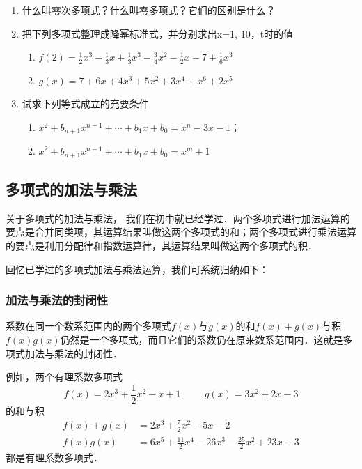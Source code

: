 \begin{ex}
\begin{enumerate}
    \item 
    什么叫零次多项式？什么叫零多项式？它们的区别是什么？
    \item 把下列多项式整理成降幂标准式，并分别求出x=1, 10，t时的值
    \begin{enumerate}
        \item $f (2) =\frac{1}{2}x^3-\frac{1}{3}x+\frac{1}{3}x^3-\frac{3}{4}x^2-\frac{1}{2}x-7+\frac{1}{6}x^3$
        \item $g(x)=7+6x+4x^3+5x^2+3x^4+x^6+2x^5$
    \end{enumerate}  
    \item 试求下列等式成立的充要条件
    \begin{enumerate}
        \item $x^2+b_{n+1}x^{n-1}+\cdots+b_1x+b_0=x^n-3x-1$；
        \item $x^2+b_{n+1}x^{n-1}+\cdots+b_1x+b_0=x^m+1$
    \end{enumerate}
\end{enumerate}
\end{ex}

\subsection{多项式的加法与乘法}

关于多项式的加法与乘法，
我们在初中就已经学过．两个多项式进行加法运算的要点是合并同类项，其运算结果叫做这两个多项式的和；两个多项式进行乘法运算的要点是利用分配律和指数运算律，其运算结果叫做这两个多项式的积．

回忆已学过的多项式加法与乘法运算，我们可系统归纳如下：

\subsubsection{加法与乘法的封闭性}

系数在同一个数系范围内的两个多项式$f(x)$与$g(x)$的和$f(x)+g(x)$与积$f(x)g(x)$仍然是一个多项式，而且它们的系数仍在原来数系范围内．这就是多项式加法与乘法的封闭性．

例如，两个有理系数多项式
\[f(x)=2x^3+\frac{1}{2}x^2-x+1,\qquad g(x)=3x^2+2x-3\]
的和与积
\[\begin{split}
    f(x)+g(x)&=2x^3+\frac{7}{2}x^2-5x-2\\
    f(x)g(x)&=6x^5+\frac{11}{2}x^4-26x^3-\frac{25}{2}x^2+23x-3
\end{split}\]
都是有理系数多项式．


